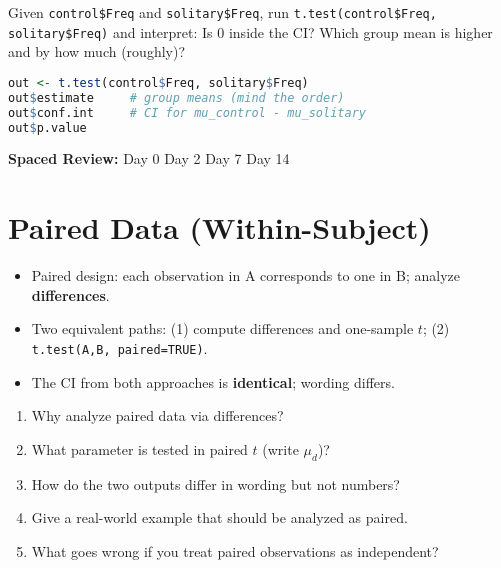 \documentclass[11pt,a4paper]{article}
\newcommand{\reviewticks}{
  \vspace{0.4em}
  \noindent\scriptsize\textbf{Spaced Review:}
  \fbox{\phantom{D0}} Day 0\quad
  \fbox{\phantom{D2}} Day 2\quad
  \fbox{\phantom{D7}} Day 7\quad
  \fbox{\phantom{D14}} Day 14
}
\begin{document}
\begin{practicebox}
Given \texttt{control\$Freq} and \texttt{solitary\$Freq}, run \texttt{t.test(control\$Freq, solitary\$Freq)} and interpret:
Is 0 inside the CI? Which group mean is higher and by how much (roughly)?
\end{practicebox}

\begin{rbox}
\begin{lstlisting}[language=R]
out <- t.test(control$Freq, solitary$Freq)
out$estimate     # group means (mind the order)
out$conf.int     # CI for mu_control - mu_solitary
out$p.value
\end{lstlisting}
\end{rbox}

\reviewticks

\section{Paired Data (Within-Subject)}

\begin{corebox}
\begin{itemize}
  \item Paired design: each observation in A corresponds to one in B; analyze \textbf{differences}.
  \item Two equivalent paths: (1) compute differences and one-sample \(t\); (2) \texttt{t.test(A,B, paired=TRUE)}.
  \item The CI from both approaches is \textbf{identical}; wording differs.
\end{itemize}
\end{corebox}

\begin{recallbox}
\begin{enumerate}
  \item Why analyze paired data via differences?
  \item What parameter is tested in paired \(t\) (write \(\mu_d\))?
  \item How do the two outputs differ in wording but not numbers?
  \item Give a real-world example that should be analyzed as paired.
  \item What goes wrong if you treat paired observations as independent?
\end{enumerate}
\end{recallbox}
\end{document}
